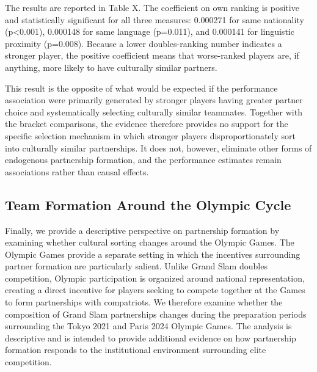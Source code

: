 \documentclass[10pt]{article}
\begin{document}
The results are reported in Table X. The coefficient on own ranking is positive and statistically significant for all three measures: 0.000271 for same nationality (p<0.001), 0.000148 for same language (p=0.011), and 0.000141 for linguistic proximity (p=0.008). Because a lower doubles-ranking number indicates a stronger player, the positive coefficient means that worse-ranked players are, if anything, more likely to have culturally similar partners.

This result is the opposite of what would be expected if the performance association were primarily generated by stronger players having greater partner choice and systematically selecting culturally similar teammates. Together with the bracket comparisons, the evidence therefore provides no support for the specific selection mechanism in which stronger players disproportionately sort into culturally similar partnerships. It does not, however, eliminate other forms of endogenous partnership formation, and the performance estimates remain associations rather than causal effects.

\subsection{Team Formation Around the Olympic Cycle}

Finally, we provide a  descriptive perspective on partnership formation by examining whether cultural sorting changes around the Olympic Games. The Olympic Games provide a separate setting in which the incentives surrounding partner formation are particularly salient. Unlike Grand Slam doubles competition, Olympic participation is organized around national representation, creating a direct incentive for players seeking to compete together at the Games to form partnerships with compatriots. We therefore examine whether the composition of Grand Slam partnerships changes during the preparation periods surrounding the Tokyo 2021 and Paris 2024 Olympic Games. The analysis is descriptive and is intended to provide additional evidence on how partnership formation responds to the institutional environment surrounding elite competition.
\end{document}
